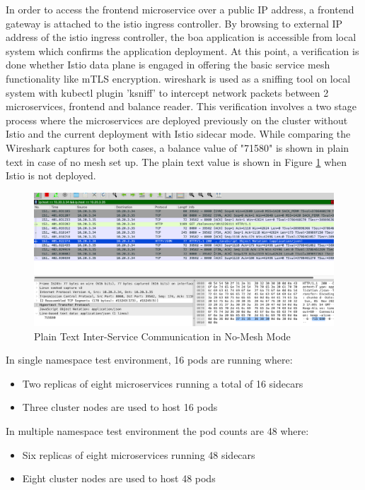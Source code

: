 In order to access the frontend microservice over a public IP address, a frontend gateway is attached to the istio ingress controller. By browsing to external IP address of the istio ingress controller, the \acrshort{boa} application is accessible from local system which confirms the application deployment. At this point, a verification is done whether Istio data plane is engaged in offering the basic service mesh functionality like mTLS encryption. \gls{wireshark} is used as a sniffing tool on local system with kubectl plugin 'ksniff' to intercept network packets between 2 microservices, frontend and balance reader. This verification involves a two stage process where the microservices are deployed previously on the cluster without Istio and the current deployment with Istio sidecar mode. While comparing the Wireshark captures for both cases, a balance value of "71580" is shown in plain text in case of no mesh set up. The plain text value is shown in Figure \ref{method:plainTxtWiresharkView} when Istio is not deployed.

\begin{figure}[ht!]
  \centering
  \includegraphics[width=1.0\linewidth]{resources/raw-balance-value.png}
  \caption{Plain Text Inter-Service Communication in No-Mesh Mode}
  \label{method:plainTxtWiresharkView}
\end{figure}

In single namespace test environment, 16 pods are running where:
\begin{itemize}
  \item Two replicas of eight microservices running a total of 16 sidecars
  \item Three cluster nodes are used to host 16 pods
\end{itemize}

In multiple namespace test environment the pod counts are 48 where:
\begin{itemize}
  \item Six replicas of eight microservices running 48 sidecars
  \item Eight cluster nodes are used to host 48 pods
\end{itemize}


